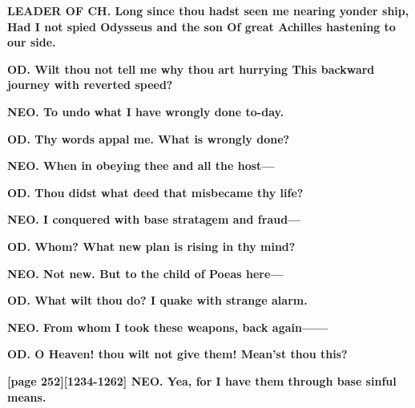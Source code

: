\documentclass[11pt,letter]{book}
\begin{document}
\par \textbf{LEADER OF CH. Long since thou hadst seen me nearing yonder ship, Had I not spied Odysseus and the son Of great Achilles hastening to our side.}
\par 

\par \textbf{OD. Wilt thou not tell me why thou art hurrying This backward journey with reverted speed?}
\par 

\par \textbf{NEO. To undo what I have wrongly done to-day.}
\par 

\par \textbf{OD. Thy words appal me. What is wrongly done?}
\par 

\par \textbf{NEO. When in obeying thee and all the host—}
\par 

\par \textbf{OD. Thou didst what deed that misbecame thy life?}
\par 

\par \textbf{NEO. I conquered with base stratagem and fraud—}
\par 

\par \textbf{OD. Whom? What new plan is rising in thy mind?}
\par 

\par \textbf{NEO. Not new. But to the child of Poeas here—}
\par 

\par \textbf{OD. What wilt thou do? I quake with strange alarm.}
\par 

\par \textbf{NEO. From whom I took these weapons, back again——}
\par 

\par \textbf{OD. O Heaven! thou wilt not give them! Mean’st thou this?}
\par 

\par \textbf{[page 252][1234-1262] NEO. Yea, for I have them through base sinful means.}
\par 
\end{document}
